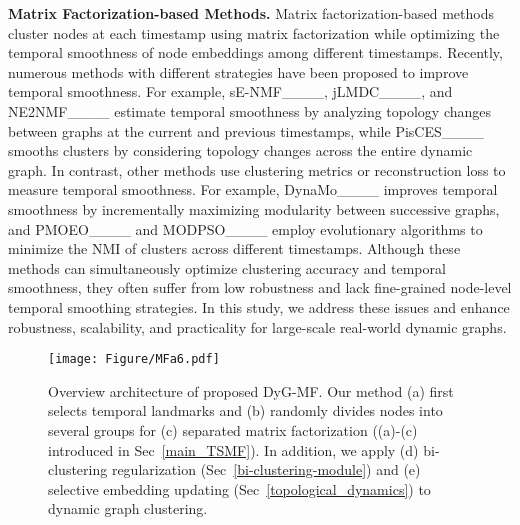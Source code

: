 \noindent \textbf{Matrix Factorization-based Methods.} 
Matrix factorization-based methods cluster nodes at each timestamp using matrix factorization while optimizing the temporal smoothness of node embeddings among different timestamps. 
Recently, numerous methods with different strategies have been proposed to improve temporal smoothness. 
For example, sE-NMF____, jLMDC____, and NE2NMF____ estimate temporal smoothness by analyzing topology changes between graphs at the current and previous timestamps, while PisCES____ smooths clusters by considering topology changes across the entire dynamic graph. 
In contrast, other methods use clustering metrics or reconstruction loss to measure temporal smoothness. For example, DynaMo____ improves temporal smoothness by incrementally maximizing modularity between successive graphs, and PMOEO____ and MODPSO____ employ evolutionary algorithms to minimize the NMI of clusters across different timestamps. %
Although these methods can simultaneously optimize clustering accuracy and temporal smoothness, they often suffer from low robustness and lack fine-grained node-level temporal smoothing strategies. In this study, we address these issues and enhance robustness, scalability, and practicality for large-scale real-world dynamic graphs. 

%

\begin{figure*}[t]
\centering
\texttt{[image: Figure/MFa6.pdf]}
\caption{Overview architecture of proposed DyG-MF. 
Our method (a) first selects temporal landmarks and (b) randomly divides nodes into several groups for (c) separated matrix factorization ((a)-(c) introduced in Sec~{\ref{main_TSMF}}). 
In addition, we apply (d) bi-clustering regularization (Sec~{\ref{bi-clustering-module}})
and (e) selective embedding updating (Sec~{\ref{topological_dynamics}}) to dynamic graph clustering. 
}\label{figure:illustrate_smftii2}
\end{figure*}